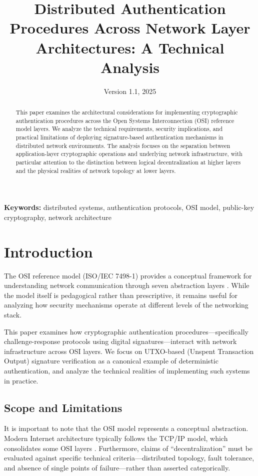\documentclass[11pt,a4paper]{article}
\title{\bfseries Distributed Authentication Procedures Across Network Layer Architectures: A Technical Analysis}
\author{}
\date{Version 1.1, 2025}
\begin{document}
\maketitle

\begin{abstract}
\noindent
This paper examines the architectural considerations for implementing cryptographic authentication procedures across the Open Systems Interconnection (OSI) reference model layers. We analyze the technical requirements, security implications, and practical limitations of deploying signature-based authentication mechanisms in distributed network environments. The analysis focuses on the separation between application-layer cryptographic operations and underlying network infrastructure, with particular attention to the distinction between logical decentralization at higher layers and the physical realities of network topology at lower layers.
\end{abstract}

\vspace{0.5cm}
\noindent\textbf{Keywords:} distributed systems, authentication protocols, OSI model, public-key cryptography, network architecture

\section{Introduction}

The OSI reference model (ISO/IEC 7498-1) provides a conceptual framework for understanding network communication through seven abstraction layers \citep{iso1994}. While the model itself is pedagogical rather than prescriptive, it remains useful for analyzing how security mechanisms operate at different levels of the networking stack.

This paper examines how cryptographic authentication procedures---specifically challenge-response protocols using digital signatures---interact with network infrastructure across OSI layers. We focus on UTXO-based (Unspent Transaction Output) signature verification as a canonical example of deterministic authentication, and analyze the technical realities of implementing such systems in practice.

\subsection{Scope and Limitations}

It is important to note that the OSI model represents a conceptual abstraction. Modern Internet architecture typically follows the TCP/IP model, which consolidates some OSI layers \citep{cerf1974}. Furthermore, claims of ``decentralization'' must be evaluated against specific technical criteria---distributed topology, fault tolerance, and absence of single points of failure---rather than asserted categorically.
\end{document}
